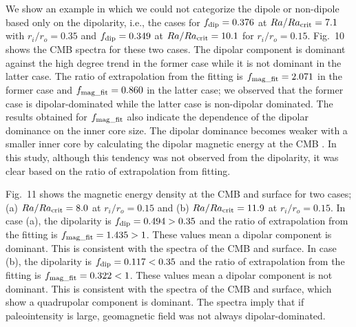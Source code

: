 We show an example in which we could not categorize the dipole or non-dipole based only on the dipolarity, i.e., the cases for $f_{\rm dip} = 0.376$ at $Ra/Ra_{\rm crit} = 7.1$ with $r_i/r_o = 0.35$ and $f_{\rm dip} = 0.349$ at $Ra/Ra_{\rm crit} = 10.1$ for $r_i/r_o = 0.15$. 
Fig.~10 shows the CMB spectra for these two cases. 
The dipolar component is dominant against the high degree trend in the former case while it is not dominant in the latter case. 
The ratio of extrapolation from the fitting is $f_{\rm mag\_fit} = 2.071$ in the former case and $f_{\rm mag\_fit} = 0.860$ in the latter case; we observed that the former case is dipolar-dominated while the latter case is non-dipolar dominated. 
The results obtained for $f_{\rm mag\_fit}$  also indicate the dependence of the dipolar dominance on the inner core size. 
The dipolar dominance becomes weaker with a smaller inner core by calculating the dipolar magnetic energy at the CMB \cite{Heimpel:2005}. 
In this study, although this tendency was not observed from the dipolarity, it was clear based on the ratio of extrapolation from fitting.

{\color{red}
Fig.~11 shows the magnetic energy density at the CMB and surface for two cases; (a) $Ra/Ra_{\rm crit} = 8.0$ at $r_i/r_o = 0.15$ and (b) $Ra/Ra_{\rm crit} = 11.9$ at $r_i/r_o = 0.15$. 
In case (a), the dipolarity is $f_{\rm dip} = 0.494 > 0.35$ and the ratio of extrapolation from the fitting is $f_{\rm mag\_fit} = 1.435 > 1$. 
These values mean a dipolar component is dominant. 
This is consistent with the spectra of the CMB and surface. 
In case (b), the dipolarity is $f_{\rm dip} = 0.117 < 0.35$ and the ratio of extrapolation from the fitting is $f_{\rm mag\_fit} = 0.322 < 1$. 
These values mean a dipolar component is not dominant. 
This is consistent with the spectra of the CMB and surface, which show a quadrupolar component is dominant. 
The spectra imply that if paleointensity is large, geomagnetic field was not always dipolar-dominated.}

